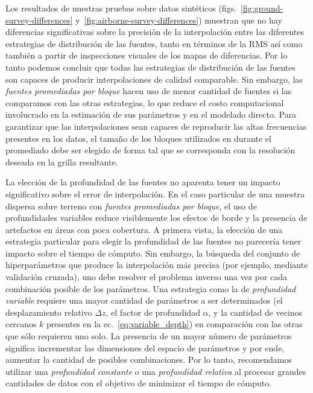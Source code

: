 Los resultados de nuestras pruebas sobre datos sintéticos
(figs.~\ref{fig:ground-survey-differences}
y~\ref{fig:airborne-survey-differences})
muestran que no hay diferencias significativas sobre la precisión de la
interpolación entre las diferentes estrategias de distribución de las fuentes,
tanto en términos de la \ac{RMS} así como también a partir de inspecciones
visuales de los mapas de diferencias.
Por lo tanto podemos concluir que todas las estrategias de distribución de las
fuentes son capaces de producir interpolaciones de calidad comparable.
Sin embargo, las \emph{fuentes promediadas por bloque} hacen uso de menor
cantidad de fuentes si las comparamos con las otras estrategias, lo que reduce
el costo computacional involucrado en la estimación de sus parámetros y en el
modelado directo.
Para garantizar que las interpolaciones sean capaces de reproducir las altas
frecuencias presentes en los datos, el tamaño de los bloques utilizados en
durante el promediado debe ser elegido de forma tal que se corresponda con la
resolución deseada en la grilla resultante.

La elección de la profundidad de las fuentes no aparenta tener un impacto
significativo sobre el error de interpolación.
En el caso particular de una muestra dispersa sobre terreno
con \emph{fuentes promediadas por bloque}, el uso de profundidades variables
reduce visiblemente los efectos de borde y la presencia de artefactos en áreas
con poca cobertura.
A primera vista, la elección de una estrategia particular para elegir la
profundidad de las fuentes no parecería tener impacto sobre el tiempo de
cómputo.
Sin embargo, la búsqueda del conjunto de hiperparámetros que produce la
interpolación más precisa (por ejemplo, mediante validación cruzada), uno debe
resolver el problema inverso una vez por cada combinación posible de los
parámetros.
Una estrategia como la de \emph{profundidad variable} requiere una mayor
cantidad de parámetros a ser determinados (el desplazamiento relativo $\Delta
z$, el factor de profundidad $\alpha$, y la cantidad de vecinos cercanos $k$
presentes en la ec.~\ref{eq:variable_depth})
en comparación con las otras que sólo requieren uno solo.
La presencia de un mayor número de parámetros significa incrementar las
dimensiones del espacio de parámetros y por ende, aumentar la cantidad de
posibles combinaciones.
Por lo tanto, recomendamos utilizar una \emph{profundidad constante} o una
\emph{profundidad relativa} al procesar grandes cantidades de datos con el
objetivo de minimizar el tiempo de cómputo.

